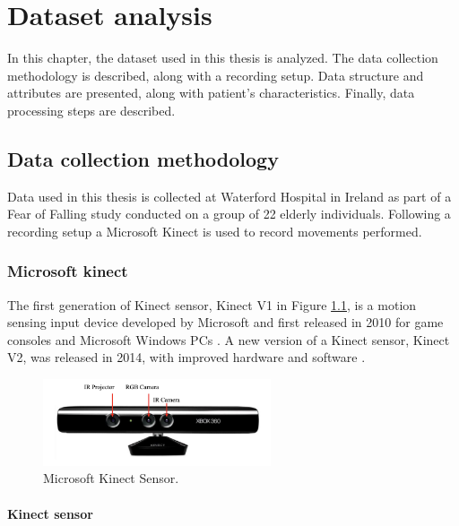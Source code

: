 \hypersetup{colorlinks=true, linkcolor=blue, citecolor=red}

\chapter{Dataset analysis} \label{chap:dataset_analysis}

    In this chapter, the dataset used in this thesis is analyzed. The data collection methodology is described, along with a recording setup. Data structure and attributes are presented, along with patient's characteristics. Finally, data processing steps are described.

    \section{Data collection methodology}
        
        Data used in this thesis is collected at Waterford Hospital in Ireland as part of a Fear of Falling study conducted on a group of 22 elderly individuals. Following a recording setup a Microsoft Kinect is used to record movements performed. 

        \subsection{Microsoft kinect}

            The first generation of Kinect sensor, Kinect V1 in Figure \ref{fig:kinect_sensor}, is a motion sensing input device developed by Microsoft and first released in 2010 for game consoles and Microsoft Windows PCs \cite{xu_validity_2015}. A new version of a Kinect sensor, Kinect V2, was released in 2014, with improved hardware and software \cite{cruz_kinect_2012}. 

            \begin{figure}[H]
                \centering
                \includegraphics[width=0.6\textwidth]{./resources/images/kinect/kinect.png}
                \caption{Microsoft Kinect Sensor.}
                \label{fig:kinect_sensor}
            \end{figure}

                    \subsubsection{Kinect sensor} 

